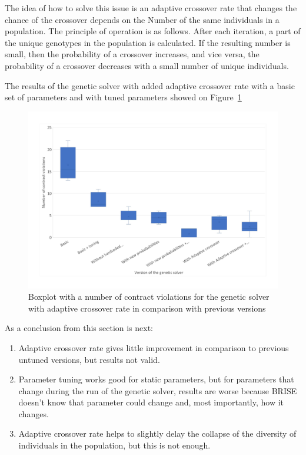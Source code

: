 The idea of how to solve this issue is an adaptive crossover rate that changes the chance of the crossover depends on the Number of the same individuals in a population. 
The principle of operation is as follows. After each iteration, a part of the unique genotypes in the population is calculated. If the resulting number is small, then the probability of a crossover increases, and vice versa, the probability of a crossover decreases with a small number of unique individuals.

The results of the genetic solver with added adaptive crossover rate with a basic set of parameters and with tuned parameters showed on Figure~\ref{fig:boxplotsolverAdaptiveCrossoverTuning}
\begin{figure}
	\centering
	\includegraphics[width=\textwidth]{images/BoxPlotSolverAdaptiveCrossoverTuning.pdf}
	\caption[Boxplot with a number of contract violations for the genetic solver with adaptive crossover rate in comparison with previous versions]{Boxplot with a number of contract violations for the genetic solver with adaptive crossover rate in comparison with previous versions}
	\label{fig:boxplotsolverAdaptiveCrossoverTuning}
\end{figure}

As a conclusion from this section is next:
\begin{enumerate}
	\item Adaptive crossover rate gives little improvement in comparison to previous untuned versions, but results not valid.
	\item Parameter tuning works good for static parameters, but for parameters that change during the run of the genetic solver, results are worse because BRISE doesn't know that parameter could change and, most importantly, how it changes.
	\item Adaptive crossover rate helps to slightly delay the collapse of the diversity of individuals in the population, but this is not enough.
\end{enumerate}                         

